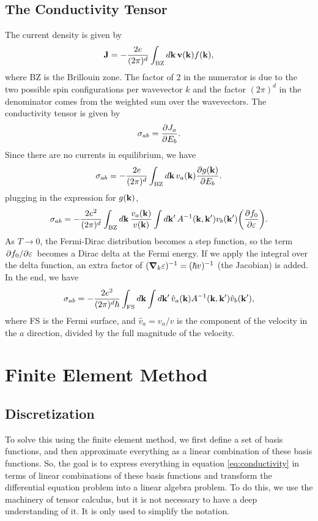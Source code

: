 \documentclass[12pt]{article}
\begin{document}
\subsection{The Conductivity Tensor}
The current density is given by
\begin{equation}
    \vb{J} = -\frac{2e}{(2\pi)^d} \int_{\text{BZ}} \dd{\vb{k}} \vb{v}(\vb{k}) f(\vb{k}),
\end{equation}
where BZ is the Brillouin zone. The factor of 2 in the numerator is due to the two possible spin
configurations per wavevector $k$ and the factor $(2\pi)^d$ in the denominator comes from the
weighted sum over the wavevectors. The conductivity tensor is given by
\begin{equation}
    \sigma_{ab} = \pdv{J_a}{E_b}.
\end{equation}
Since there are no currents in equilibrium, we have
\begin{equation}
    \sigma_{ab} = -\frac{2e}{(2\pi)^d} \int_{\text{BZ}}\dd{\vb{k}} v_a(\vb{k}) \pdv{g(\vb{k})}{E_b}.
\end{equation}
plugging in the expression for $g(\vb{k})$,
\begin{equation}
    \sigma_{ab} = -\frac{2e^2}{(2\pi)^d} \int_{\text{BZ}}\dd{\vb{k}} \frac{v_a(\vb{k})}{v(\vb{k})}
    \int\dd{\vb{k'}} A^{-1}(\vb{k}, \vb{k'}) v_b(\vb{k'})\qty(\pdv{f_0}{\varepsilon}).
\end{equation}
As $T\to0$, the Fermi-Dirac distribution becomes a step function, so the term
$\pdv*{f_0}{\varepsilon}$ becomes a Dirac delta at the Fermi energy. If we apply the integral over
the delta function, an extra factor of $(\grad_{k}\varepsilon)^{-1} = (\hbar v)^{-1}$ (the Jacobian)
is added. In the end, we have
\begin{equation}
    \sigma_{ab} = -\frac{2e^2}{(2\pi)^d\hbar} \int_{\text{FS}}\dd{\vb{k}}\int\dd{\vb{k'}}
    \hat{v}_a(\vb{k}) A^{-1}(\vb{k}, \vb{k'}) \hat{v}_b(\vb{k'}),
    \label{eq:conductivity}
\end{equation}
where FS is the Fermi surface, and $\hat{v}_a=v_a/v$ is the component of the velocity in the
$a$ direction, divided by the full magnitude of the velocity.

\section{Finite Element Method}
\subsection{Discretization}
To solve this using the finite element method, we first define a set of basis functions, and then
approximate everything as a linear combination of these basis functions. So, the goal is to express
everything in equation \eqref{eq:conductivity} in terms of linear combinations of these basis
functions and transform the differential equation problem into a linear algebra problem. To do this,
we use the machinery of tensor calculus, but it is not necessary to have a deep understanding of it.
It is only used to simplify the notation.
\end{document}
